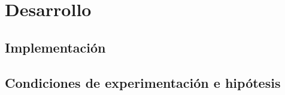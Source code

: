 \section{Desarrollo}



\subsection{Implementación}


\subsection{Condiciones de experimentación e hipótesis}




